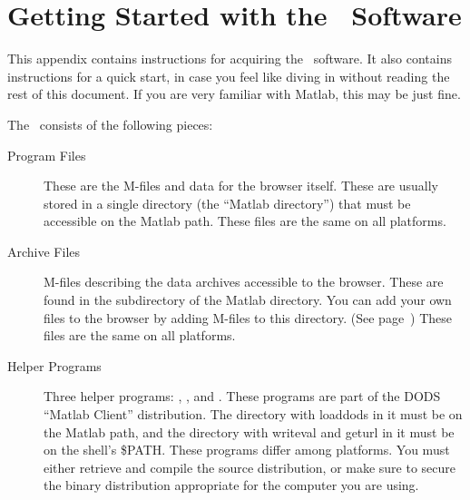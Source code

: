 %
%
%
%
%
%
%
%
%
%

\chapter{Getting Started with the \GUI\ Software}
\label{gui,install}

This appendix contains instructions for acquiring the \GUI\
software. It also contains instructions for a quick start, in case you
feel like diving in without reading the rest of this document. If you
are very familiar with Matlab, this may be just fine.

The \GUI\ consists of the following pieces:

\begin{description}

\item[Program Files]

These are the M-files and data for the browser itself. These are
usually stored in a single directory (the ``Matlab directory'') that
must be accessible on the Matlab path. These files are the same on all
platforms.

\item[Archive Files]

M-files describing the data archives accessible to the browser.  These
are found in the \lit{DATASETS} subdirectory of the Matlab
directory. You can add your own files to the browser by adding M-files
to this directory. (See page~\pageref{gui,adding,manifest.lcl}) These
files are the same on all platforms.

\item[Helper Programs]

Three helper programs: , , and
. These programs are part of the DODS ``Matlab Client''
distribution. The directory with loaddods in it must be on the Matlab
path, and the directory with writeval and geturl in it must be on the
shell's \$PATH. These programs differ among platforms. You must either
retrieve and compile the source distribution, or make sure to secure
the binary distribution appropriate for the computer you are using.

\end{description}

